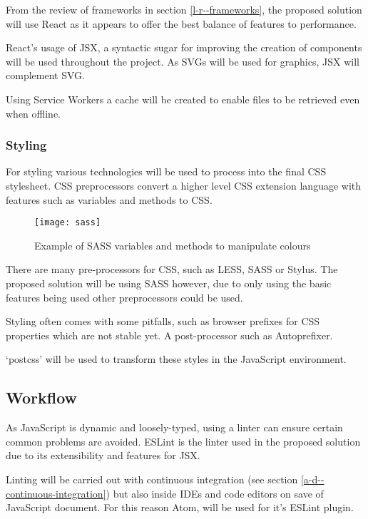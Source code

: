 From the review of frameworks in section \ref{l-r--frameworks}, the proposed solution will use React as it appears to offer the best balance of features to performance.

React's usage of JSX, a syntactic sugar for improving the creation of components will be used throughout the project. As SVGs will be used for graphics, JSX will complement SVG. \cite{jsx}

Using Service Workers a cache will be created to enable files to be retrieved even when offline.

\subsubsection{Styling} \label{a-d--t--styling}
For styling various technologies will be used to process into the final CSS stylesheet. CSS preprocessors convert a higher level CSS extension language with features such as variables and methods to CSS.

\begin{figure}[H]
  \centering
    \texttt{[image: sass]}
  \caption{Example of SASS variables and methods to manipulate colours}
  \label{figure-sass}
\end{figure}

There are many pre-processors for CSS, such as LESS, SASS or Stylus. The proposed solution will be using SASS however, due to only using the basic features being used other preprocessors could be used. \cite{SASS}

Styling often comes with some pitfalls, such as browser prefixes for CSS properties which are not stable yet. A post-processor such as Autoprefixer. \cite{autoprefixer}

`postcss' will be used to transform these styles in the JavaScript environment. \cite{postcss}

\subsection{Workflow} \label{a-d--workflow}

As JavaScript is dynamic and loosely-typed, using a linter can ensure certain common problems are avoided. ESLint is the linter used in the proposed solution due to its extensibility and features for JSX. \cite{eslint}

Linting will be carried out with continuous integration (see section \ref{a-d--continuous-integration}) but also inside IDEs and code editors on save of JavaScript document. For this reason Atom, will be used for it's ESLint plugin.

